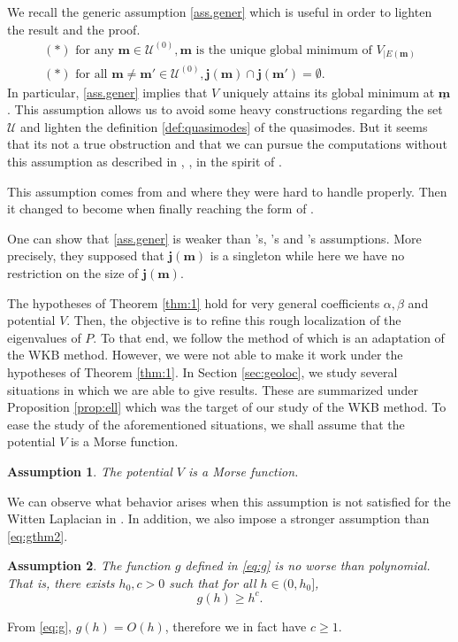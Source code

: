 \documentclass[12pt]{amsart}
\numberwithin{equation}{section}
\numberwithin{figure}{section}
\def\m{\mathbf{m}}
\def\j{\mathbf{j}}
\def\um{\underline{\m}}
\newtheorem{assumption}{Assumption}
\def\uuu{{\mathcal U}}\def\vvv{{\mathcal V}}\def\www{{\mathcal W}}\def\xxx{{\mathcal X}}
\begin{document}
We recall the generic assumption \eqref{ass.gener} which is useful in order to lighten the result and the proof.
\begin{equation}\label{ass.gener}\tag{Gener}
\begin{array}{l}
    (\ast)\mbox{ for any }\m\in\uuu^{(0)},\m \mbox{ is the unique global minimum of } V_{|E(\m)}\\
    (\ast)\mbox{ for all }\m\neq\m'\in\uuu^{(0)},\j(\m)\cap\j(\m')=\emptyset.
\end{array}
\end{equation}
In particular, \eqref{ass.gener} implies that $V$ uniquely attains its global minimum at $\um$. This assumption allows us to avoid some heavy constructions regarding the set $\uuu$ and lighten the definition \ref{def:quasimodes} of the quasimodes. But it seems that its not a true obstruction and that we can pursue the computations without this assumption as described in \cite[Section 6]{BoLePMi22}, \cite{No24}, in the spirit of \cite{Mi19}.

This assumption comes from \cite[(1.7)]{BoGaKl05_01} and \cite[Assumption 3.8]{HeKlNi04_01} where they were hard to handle properly. Then it changed to become \cite[Hypothesis 5.1]{HeHiSj11_01} when finally reaching the form of \cite[Assumption 4]{LePMi20}.

One can show that \eqref{ass.gener} is weaker than \cite{BoGaKl05_01}'s, \cite{HeKlNi04_01}'s and \cite{HeHiSj11_01}'s assumptions. More precisely, they supposed that $\j(\m)$ is a singleton while here we have no restriction on the size of $\j(\m)$.





The hypotheses of Theorem \ref{thm:1} hold for very general coefficients $\alpha,\beta$ and potential $V$. Then, the objective is to refine this rough localization of the eigenvalues of $P$. To that end, we follow the method of \cite[Section 3]{BoLePMi22} which is an adaptation of the WKB method. However, we were not able to make it work under the hypotheses of Theorem \ref{thm:1}. In Section \ref{sec:geoloc}, we study several situations in which we are able to give results. These are summarized under Proposition \ref{prop:ell} which was the target of our study of the WKB method. To ease the study of the aforementioned situations, we shall assume that the potential $V$ is a Morse function.
\begin{assumption}\label{ass:vraimentMorse}
    The potential $V$ is a Morse function.
\end{assumption}
We can observe what behavior arises when this assumption is not satisfied for the Witten Laplacian in \cite{De25_1}. In addition, we also impose a stronger assumption than \eqref{eq:gthm2}.
\begin{assumption}\label{ass.polyg}
    The function $g$ defined in \eqref{eq:g} is no worse than polynomial. That is, there exists $h_0,c>0$ such that for all $h\in(0,h_0]$,
    \begin{equation*}
    g(h)\geq h^c.
    \end{equation*}
\end{assumption}
From \eqref{eq:g}, $g(h) = O(h)$, therefore we in fact have $c\geq1$.
\end{document}
